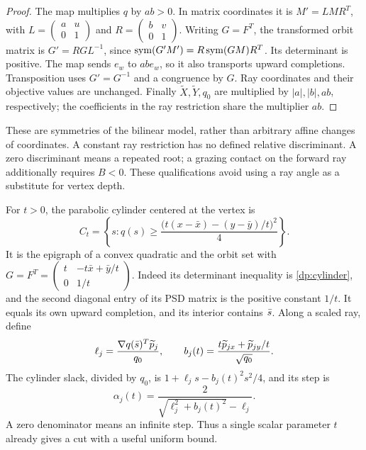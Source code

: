 \begin{proof}
The map multiplies $q$ by $ab>0$. In matrix coordinates it is
$M'=L M R^T$, with
$L=\left(\begin{smallmatrix}a&u\\0&1\end{smallmatrix}\right)$ and
$R=\left(\begin{smallmatrix}b&v\\0&1\end{smallmatrix}\right)$.
Writing $G=F^T$, the transformed orbit matrix is $G'=RGL^{-1}$, since
$\operatorname{sym}(G'M')=R\operatorname{sym}(GM)R^T$. Its determinant is positive. The map sends
$e_w$ to $ab e_w$, so it also transports upward completions. Transposition
uses $G'=G^{-1}$ and a congruence by $G$. Ray coordinates and their objective
values are unchanged. Finally $\widetilde X,\widetilde Y,q_0$ are multiplied
by $|a|,|b|,ab$, respectively; the coefficients in the ray restriction share
the multiplier $ab$.
\end{proof}

These are symmetries of the bilinear model, rather than arbitrary affine
changes of coordinates. A constant ray restriction has no defined relative
discriminant. A zero discriminant means a repeated root; a grazing contact
on the forward ray additionally requires $B<0$. These qualifications avoid
using a ray angle as a substitute for vertex depth.

For $t>0$, the parabolic cylinder centered at the vertex is
\begin{equation}\label{dp:cylinder}
 C_t=\left\{s:q(s)\ge
 \frac{\bigl(t(x-\bar x)-(y-\bar y)/t\bigr)^2}{4}\right\}.
\end{equation}
It is the epigraph of a convex quadratic and the orbit set with
$G=F^T=\left(\begin{smallmatrix}t&-t\bar x+\bar y/t\\0&1/t\end{smallmatrix}\right)$.
Indeed its determinant inequality is \cref{dp:cylinder}, and the second
diagonal entry of its PSD matrix is the positive constant $1/t$.
It equals its own upward completion, and its interior contains $\bar s$.
Along a scaled ray, define
\[
 \ell_j=\frac{\nabla q(\bar s)^T\widetilde p_j}{q_0},\qquad
 b_j(t)=\frac{t\widetilde p_{jx}+\widetilde p_{jy}/t}{\sqrt{q_0}}.
\]
The cylinder slack, divided by $q_0$, is
$1+\ell_js-b_j(t)^2s^2/4$, and its step is
\begin{equation}\label{dp:cylinder-step}
 \alpha_j(t)=\frac{2}{\sqrt{\ell_j^2+b_j(t)^2}-\ell_j}.
\end{equation}
A zero denominator means an infinite step. Thus a single scalar parameter
$t$ already gives a cut with a useful uniform bound.

